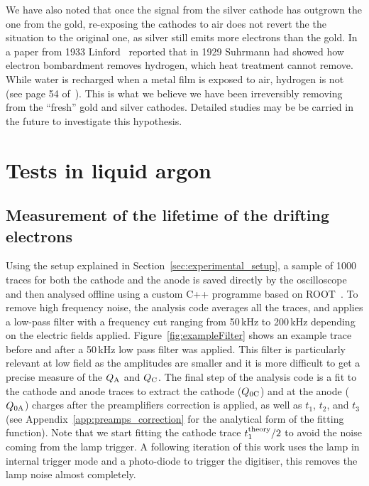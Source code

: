 \documentclass[a4paper,11pt]{article}
\begin{document}
We have also noted that once the signal from the silver cathode has outgrown the one from the gold, re-exposing the cathodes to air does not revert the the situation to the original one, as silver still emits more electrons than the gold. 
In a paper from 1933 Linford~\cite{Linford} reported that in 1929 Suhrmann had showed how electron bombardment removes hydrogen, which heat treatment cannot remove. While water is recharged when a metal film is exposed to air, hydrogen is not (see page 54 of~\cite{Linford}). This is what we believe we have been irreversibly removing from the ``fresh'' gold and silver cathodes. Detailed studies may be be carried in the future to investigate this hypothesis.  

\section{Tests in liquid argon}
\label{sec:tests_liquid}

\subsection{Measurement of the lifetime of the drifting electrons}
Using the setup explained in Section~\ref{sec:experimental_setup}, a sample of 1000 traces for both the cathode and the anode is saved directly by the oscilloscope and then analysed offline using a custom C++ programme based on ROOT~\cite{Brun:1997pa}. 
To remove high frequency noise, the analysis code averages all the traces,  and applies a low-pass filter with a frequency cut ranging from 50\,kHz to 200\,kHz depending on the electric fields applied. 
Figure~\ref{fig:exampleFilter} shows an example trace before and after a 50\,kHz low pass filter was applied. This filter is particularly relevant at low field as the amplitudes are smaller and it is more difficult to get a precise measure of the $Q_{\rm A}$ and $Q_{\rm C}$. 
The final step of the analysis code is a fit to the cathode and anode traces to extract the cathode ($Q_{0\rm C}$) and at the anode ($Q_{0\rm A}$) charges after the preamplifiers correction is applied, as well as $t_1$, $t_2$, and $t_3$ (see Appendix~\ref{app:preamps_correction} for the analytical form of the fitting function). 
Note that we start fitting the cathode trace $t^{\rm theory}_1/2$ to avoid the noise coming from the lamp trigger. 
A following iteration of this work uses the lamp in internal trigger mode and a photo-diode to trigger the digitiser, this removes the lamp noise almost completely.
\end{document}
